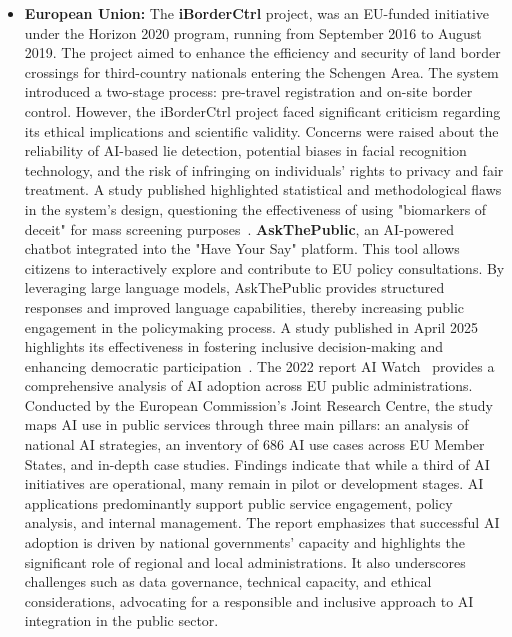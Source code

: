 \documentclass[12pt]{report}
\begin{document}
\begin{itemize}
    \item \textbf{European Union:} The \textbf{iBorderCtrl} project,  was an EU-funded initiative under the Horizon 2020 program, running from September 2016 to August 2019. The project aimed to enhance the efficiency and security of land border crossings for third-country nationals entering the Schengen Area. The system introduced a two-stage process: pre-travel registration and on-site border control. However, the iBorderCtrl project faced significant criticism regarding its ethical implications and scientific validity. Concerns were raised about the reliability of AI-based lie detection, potential biases in facial recognition technology, and the risk of infringing on individuals' rights to privacy and fair treatment. A study published highlighted statistical and methodological flaws in the system's design, questioning the effectiveness of using "biomarkers of deceit" for mass screening purposes~\cite{sánchezmonedero2020politicsdeceptivebordersbiomarkers}. 
    \textbf{AskThePublic}, an AI-powered chatbot integrated into the "Have Your Say" platform. This tool allows citizens to interactively explore and contribute to EU policy consultations. By leveraging large language models, AskThePublic provides structured responses and improved language capabilities, thereby increasing public engagement in the policymaking process. A study published in April 2025 highlights its effectiveness in fostering inclusive decision-making and enhancing democratic participation~\cite{sprenkamp2025effectiveeueparticipationdevelopment}.
    The 2022 report AI Watch~\cite{doi/10.2760/39336} provides a comprehensive analysis of AI adoption across EU public administrations. Conducted by the European Commission's Joint Research Centre, the study maps AI use in public services through three main pillars: an analysis of national AI strategies, an inventory of 686 AI use cases across EU Member States, and in-depth case studies. Findings indicate that while a third of AI initiatives are operational, many remain in pilot or development stages. AI applications predominantly support public service engagement, policy analysis, and internal management. The report emphasizes that successful AI adoption is driven by national governments' capacity and highlights the significant role of regional and local administrations. It also underscores challenges such as data governance, technical capacity, and ethical considerations, advocating for a responsible and inclusive approach to AI integration in the public sector.
    
\end{itemize}
\end{document}
